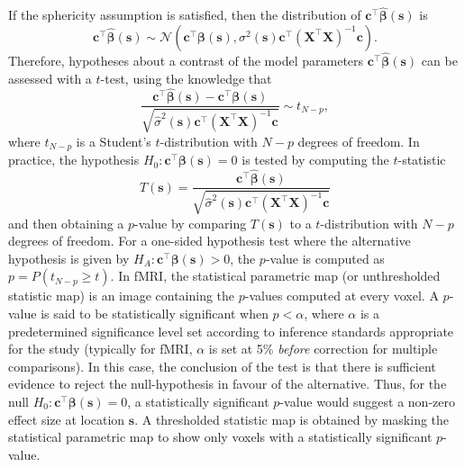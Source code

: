 If the sphericity assumption is satisfied, then the distribution of $\bm{c}^{\intercal}\bm{\hat{\beta}}(\bm{s})$ is 
\begin{equation}
\label{eq:contrast_distribution}
\bm{c}^{\intercal}\bm{\hat{\beta}}(\bm{s}) \sim \mathcal{N}(\bm{c}^{\intercal}\bm{\beta}(\bm{s}), \sigma^{2}(\bm{s})\bm{c}^{\intercal}(\bm{X}^{\intercal}\bm{X})^{-1}\bm{c}).
\end{equation}
Therefore, hypotheses about a contrast of the model parameters $\bm{c}^{\intercal}\bm{\hat{\beta}}(\bm{s})$ can be assessed with a $t$-test, using the knowledge that
\begin{equation}
\label{eq:contrast_minus_param_distribution}
\frac{\bm{c}^{\intercal}\bm{\hat{\beta}}(\bm{s}) - \bm{c}^{\intercal}\bm{\beta}(\bm{s})}{\sqrt{\hat{\sigma}^{2}(\bm{s})\bm{c}^{\intercal}(\bm{X}^{\intercal}\bm{X})^{-1}\bm{c}}} \sim t_{N-p},
\end{equation}
where $t_{N-p}$ is a  Student's $t$-distribution with $N-p$ degrees of freedom. In practice, the hypothesis $H_{0} : \bm{c}^{\intercal}\bm{\beta}(\bm{s}) = 0$ is tested by computing the $t$-statistic 
\begin{equation}
\label{eq:t_statistic}
T(\bm{s}) = \frac{\bm{c}^{\intercal}\bm{\hat{\beta}}(\bm{s})}{\sqrt{\hat{\sigma}^{2}(\bm{s})\bm{c}^{\intercal}(\bm{X}^{\intercal}\bm{X})^{-1}\bm{c}}}
\end{equation}
and then obtaining a $p$-value by comparing $T(\bm{s})$ to a $t$-distribution with $N-p$ degrees of freedom. For a one-sided hypothesis test where the alternative hypothesis is given by $H_{A} : \bm{c}^{\intercal}\bm{\beta}(\bm{s}) > 0$, the $p$-value is computed as $p = P(t_{N-p} \geq t)$. In fMRI, the statistical parametric map (or unthresholded statistic map) is an image containing the $p$-values computed at every voxel. A $p$-value is said to be statistically significant when $p < \alpha$, where $\alpha$ is a predetermined significance level set according to inference standards appropriate for the study (typically for fMRI, $\alpha$ is set at 5\% \textit{before} correction for multiple comparisons). In this case, the conclusion of the test is that there is sufficient evidence to reject the null-hypothesis in favour of the alternative. Thus, for the null $H_{0} : \bm{c}^{\intercal}\bm{\beta}(\bm{s}) = 0$, a statistically significant $p$-value would suggest a non-zero effect size at location $\bm{s}$. A thresholded statistic map is obtained by masking the statistical parametric map to show only voxels with a statistically significant $p$-value. 

